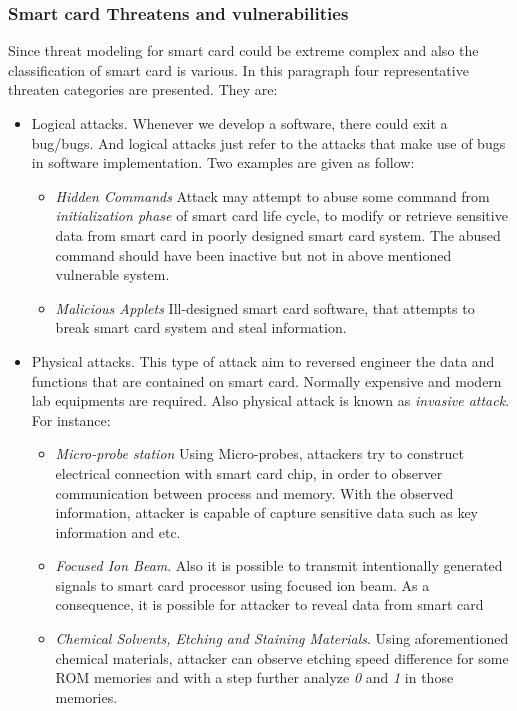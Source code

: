 \subsubsection{Smart card Threatens and vulnerabilities}
Since threat modeling for smart card could be extreme complex and also the classification of smart card is various. In this paragraph four representative threaten categories are presented. They are\cite{smart_card_attack2}:
\begin{itemize}
\item Logical attacks. Whenever we develop a software, there could exit a bug/bugs. And logical attacks just refer to the attacks that make use of bugs in software implementation\cite{smart_card_attack2}. Two examples are given as follow:
\begin{itemize}
\item \emph{Hidden Commands} Attack may attempt to abuse some command from \emph{initialization phase} of smart card life cycle, to modify or retrieve sensitive data from smart card in poorly designed smart card system. The abused command should have been inactive but not in above mentioned vulnerable system\cite{smart_card_attack2}.
\item \emph{Malicious Applets} Ill-designed smart card software, that attempts to break smart card system and steal information.
\end{itemize}
\item Physical attacks. This type of attack aim to reversed engineer the data and functions that are contained on smart card. Normally expensive and modern lab equipments are required\cite{smart_card_attack2}. Also physical attack is known as \emph{invasive attack}\cite{smart_card_attack3}. For instance:
\begin{itemize} 
\item \emph{Micro-probe station} Using Micro-probes, attackers try to construct electrical connection with smart card chip, in order to observer communication between process and memory. With the observed information, attacker is capable of capture sensitive data such as key information and etc\cite{smart_card_attack3}.
\item \emph{Focused Ion Beam}. Also it is possible to transmit intentionally generated signals to smart card processor using focused ion beam. As a consequence, it is possible for attacker to reveal data from smart card\cite{smart_card_attack3}
\item \emph{Chemical Solvents, Etching and Staining Materials}. Using aforementioned chemical materials, attacker can observe etching speed difference for some ROM memories  and with a step further analyze \emph{0} and \emph{1} in those memories\cite{smart_card_attack2}.

\end{itemize}
\end{itemize}
